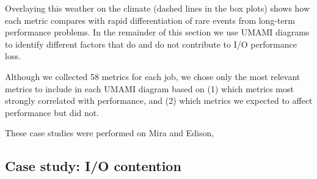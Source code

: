 Overlaying this weather on the climate (dashed lines in the box plots) shows how each metric compares with  rapid differentiation of rare events from long-term performance problems.
In the remainder of this section we use UMAMI diagrams to identify different factors that do and do not contribute to I/O performance loss.
{Although we collected 58 metrics for each job, we chose only the most relevant metrics to include in each UMAMI diagram based on (1) which metrics most strongly correlated with performance, and (2) which metrics we expected to affect performance but did not.

These case studies were performed on Mira and Edison, %

\subsection{Case study: I/O contention}

}
